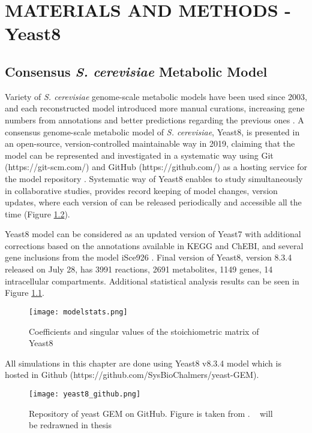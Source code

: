 \chapter{MATERIALS AND METHODS - Yeast8}

\section{Consensus \emph{S. cerevisiae} Metabolic Model}
Variety of \emph{S. cerevisiae} genome-scale metabolic models have been used since 2003, and each reconstructed model introduced more manual curations, increasing gene numbers from annotations and better predictions regarding the previous ones \cite{lopes2017genome}. A consensus genome-scale metabolic model of \emph{S. cerevisiae}, Yeast8, is presented in an open-source, version-controlled maintainable way in 2019, claiming that the model can be represented and investigated in a systematic way using Git (https://git-scm.com/) and GitHub (https://github.com/) as a hosting service for the model repository \cite{lu2019consensus}. Systematic way of Yeast8 enables to study simultaneously in collaborative studies, provides record keeping of model changes, version updates, where each version of can be released periodically and accessible all the time (Figure \ref{fig:yeast8_github}).

Yeast8 model can be considered as an updated version of Yeast7 \cite{aung2013revising} with additional corrections based on the annotations available in KEGG and ChEBI, and several gene inclusions from the model iSce926 \cite{chowdhury2015using}. Final version of Yeast8, version 8.3.4 released on July 28, has 3991 reactions, 2691 metabolites, 1149 genes, 14 intracellular compartments. Additional statistical analysis results can be seen in Figure \ref{fig:modelstats}.

\begin{figure}[H]
\begin{center}
\texttt{[image: modelstats.png]}
\end{center}
\caption[Coefficients and singular values of the stoichiometric matrix of Yeast8]{Coefficients and singular values of the stoichiometric matrix of Yeast8}
\label{fig:modelstats}
\end{figure}

All simulations in this chapter are done using Yeast8 v8.3.4 model which is hosted in Github (https://github.com/SysBioChalmers/yeast-GEM).

\begin{figure}[H]
\begin{center}
\texttt{[image: yeast8\_github.png]}
\end{center}
\caption[Repository of yeast GEM on GitHub]{Repository of yeast GEM on GitHub. Figure is taken from \cite{lu2019consensus}. ~ will be redrawned in thesis}
\label{fig:yeast8_github}
\end{figure}

